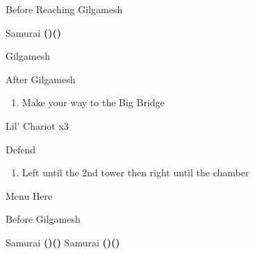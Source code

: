 \begin{paracol}{2}
\switchcolumn
\begin{menu}{Before Reaching Gilgamesh}
    \varwb
    \begin{jobMenu}
        \galuf Samurai \textbf{(\pointLeft)(\pointDown)} \ability{!\white}
    \end{jobMenu}
    \varwe
\end{menu}

\begin{boss}{Gilgamesh}
	\varwb
	\begin{round}{1}
        \galuf \leftCommand{\gilToss}
    \end{round}
	\varwe
\end{boss}

\switchcolumn
\begin{steproute}{After Gilgamesh}
\end{steproute}

\switchcolumn*
\begin{enumerate}
    \item Make your way to the Big Bridge
\end{enumerate}

\begin{encounter}{Lil' Chariot x3}
	\varwb
	\begin{round}{1}
		\bartz Defend
        \lenna \leftCommand{\throw} \then \thunderScroll
    \end{round}
	\varwe
\end{encounter}

\begin{enumerate}[resume]
    \item Left until the 2nd tower then right until the chamber
\end{enumerate}

\switchcolumn*
\begin{misc}{Menu Here}
\end{misc}

\switchcolumn
\begin{menu}{Before Gilgamesh}
    \varwb
    \begin{jobMenu}
        \lenna Samurai \textbf{(\pointLeft)(\pointDown)} \optimize
        \bartz Samurai \textbf{(\pointLeft)(\pointDown)}
    \end{jobMenu}
    \begin{magicMenu}
        \galuf \cure \space \then {}
    \end{magicMenu}
    \varwe
\end{menu}


\end{paracol}
